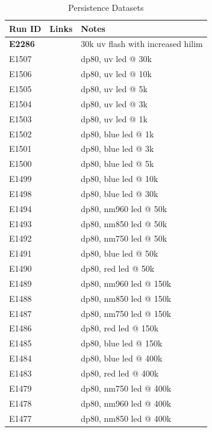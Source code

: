 \begin{table}[ht]
\centering
\caption{Persistence Datasets\label{table:runs_persistence}}
\begin{tabular}{|p{1.5cm}|p{2.9cm}|p{9cm}|}
\hline
Run ID & Links & Notes \\ \hline
\textbf{E2286} & & 30k uv flash with increased hilim\\ \hline
E1507 & & dp80, uv led @ 30k \\ \hline
E1506 & & dp80, uv led @ 10k\\ \hline
E1505 & & dp80, uv led @ 5k\\ \hline
E1504 & & dp80, uv led @ 3k\\ \hline
E1503 & & dp80, uv led @ 1k\\ \hline
E1502 & & dp80, blue led @ 1k\\ \hline
E1501 & & dp80, blue led @ 3k\\ \hline
E1500 & & dp80, blue led @ 5k\\ \hline
E1499 & & dp80, blue led @ 10k\\ \hline
E1498 & & dp80, blue led @ 30k\\ \hline
E1494 & & dp80, nm960 led @ 50k\\ \hline
E1493 & & dp80, nm850 led @ 50k\\ \hline
E1492 & & dp80, nm750 led @ 50k\\ \hline
E1491 & & dp80, blue led @ 50k\\ \hline
E1490 & & dp80, red led @ 50k\\ \hline
E1489 & & dp80, nm960 led @ 150k\\ \hline
E1488 & & dp80, nm850 led @ 150k\\ \hline
E1487 & & dp80, nm750 led @ 150k\\ \hline
E1486 & & dp80, red led @ 150k\\ \hline
E1485 & & dp80, blue led @ 150k\\ \hline
E1484 & & dp80, blue led @ 400k\\ \hline
E1483 & & dp80, red led @ 400k\\ \hline
E1479 & & dp80, nm750 led @ 400k\\ \hline
E1478 & & dp80, nm960 led @ 400k\\ \hline
E1477 & & dp80, nm850 led @ 400k\\ \hline
\end{tabular}
\end{table}

